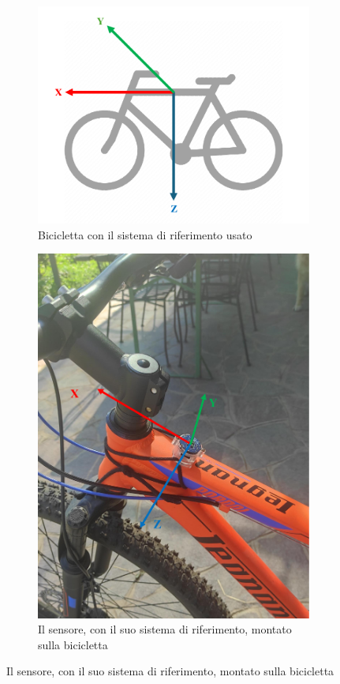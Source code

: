 \documentclass[class=article]{standalone}
\begin{document}
	\begin{center}
		\begin{figure}[h!]
			\begin{subfigure}[h]{.5\textwidth}
				\centering\includegraphics[width=.9\textwidth]{img/axis}
				\caption[]{Bicicletta con il sistema di riferimento usato}
				\label{fig:axes}
			\end{subfigure}
			\begin{subfigure}[h]{.5\textwidth}
				\centering\includegraphics[width=.7\textwidth]{img/SensorAxes}
				\caption[]{Il sensore, con il suo sistema di riferimento, montato sulla bicicletta}
				\label{fig:SensorAxes}
			\end{subfigure}
		\end{figure}
	\end{center}
	
\end{document}
